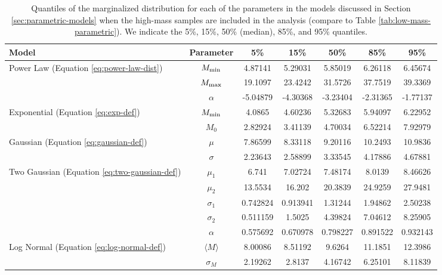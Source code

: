 \documentclass[preprint]{aastex}
\newcommand{\Mmin}{M_{\textnormal{min}}}
\newcommand{\Mmax}{M_{\textnormal{max}}}
\begin{document}
\begin{table}
  \begin{center}
    \begin{tabular}{|l|c|c|c|c|c|c|}
      \hline
      Model & Parameter & 5\% & 15\% & 50\% & 85\% & 95\% \\
      \hline \hline
      Power Law (Equation \eqref{eq:power-law-dist}) & $\Mmin$ & 
      4.87141 & 5.29031 & 5.85019 & 6.26118 & 6.45674 \\
      \hline
      & $\Mmax$ & 19.1097 & 23.4242 & 31.5726 & 37.7519 & 39.3369 \\
      \hline
      & $\alpha$ & -5.04879 & -4.30368 & -3.23404 & -2.31365 & -1.77137 \\
      \hline \hline
      Exponential (Equation \eqref{eq:exp-def})& $\Mmin$ & 
      4.0865 & 4.60236 & 5.32683 & 5.94097 & 6.22952 \\
      \hline
       & $M_0$ & 2.82924 & 3.41139 & 4.70034 & 6.52214 & 7.92979 \\
      \hline \hline
      Gaussian (Equation \eqref{eq:gaussian-def}) & $\mu$ & 
      7.86599 & 8.33118 & 9.20116 & 10.2493 & 10.9836 \\
      \hline
      & $\sigma$ & 2.23643 & 2.58899 & 3.33545 & 4.17886 & 4.67881 \\
      \hline \hline
      Two Gaussian (Equation \eqref{eq:two-gaussian-def}) & $\mu_1$ & 
      6.741 & 7.02724 & 7.48174 & 8.0139 & 8.46626 \\
      \hline
      & $\mu_2$ & 13.5534 & 16.202 & 20.3839 & 24.9259 & 27.9481 \\
      \hline
      & $\sigma_1$ & 0.742824 & 0.913941 & 1.31244 & 1.94862 & 2.50238 \\
      \hline
      & $\sigma_2$ & 0.511159 & 1.5025 & 4.39824 & 7.04612 & 8.25905 \\
      \hline
      & $\alpha$ & 0.575692 & 0.670978 & 0.798227 & 0.891522 & 0.932143 \\
      \hline \hline
      Log Normal (Equation \eqref{eq:log-normal-def}) & $\langle M \rangle$ & 
      8.00086 & 8.51192 & 9.6264 & 11.1851 & 12.3986 \\
      \hline
      & $\sigma_M$ & 2.19262 & 2.8137 & 4.16742 & 6.25101 & 8.11839 \\
      \hline
    \end{tabular}
  \end{center}
  \caption{\label{tab:high-mass-parametric} Quantiles of the
    marginalized distribution for each of the parameters in the models
    discussed in Section \ref{sec:parametric-models} when the
    high-mass samples are included in the analysis (compare to Table
    \ref{tab:low-mass-parametric}).  We indicate the 5\%, 15\%, 50\% 
    (median), 85\%, and 95\% quantiles.}
\end{table}
\end{document}
